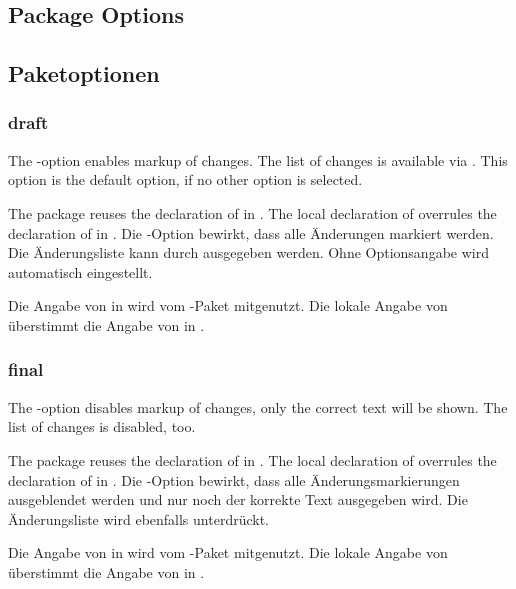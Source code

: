 \ifENGLISH
\subsection{Package Options}
\fi
\ifGERMAN
	\subsection{Paketoptionen}
\fi
\label{sec:user:options}

\subsubsection{draft}
\ifENGLISH
The -option enables markup of changes.
The list of changes is available via .
This option is the default option, if no other option is selected.

The  package reuses the declaration of  in .
The local declaration of  overrules the declaration of  in .
\fi
\ifGERMAN
	Die -Option bewirkt, dass alle Änderungen markiert werden.
	Die Änderungsliste kann durch  ausgegeben werden.
	Ohne Optionsangabe wird  automatisch eingestellt.

	Die Angabe von  in  wird vom -Paket mitgenutzt.
	Die lokale Angabe von  überstimmt die Angabe von  in .
\fi


\subsubsection{final}
\ifENGLISH
The -option disables markup of changes, only the correct text will be shown.
The list of changes is disabled, too.

The  package reuses the declaration of  in .
The local declaration of  overrules the declaration of  in .
\fi
\ifGERMAN
	Die -Option bewirkt, dass alle Änderungsmarkierungen ausgeblendet werden und nur noch der korrekte Text ausgegeben wird.
	Die Änderungsliste wird ebenfalls unterdrückt.

	Die Angabe von  in  wird vom -Paket mitgenutzt.
	Die lokale Angabe von  überstimmt die Angabe von  in .
\fi

